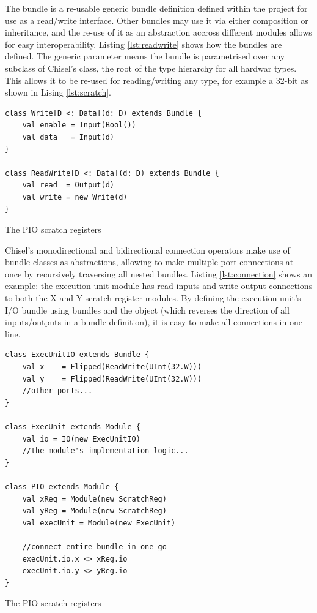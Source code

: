 The  bundle is a re-usable generic bundle definition defined within the project for use as a read/write interface. Other bundles may use it via either composition or inheritance, and the re-use of it as an abstraction accross different modules allows for easy interoperability. Listing \ref{lst:readwrite} shows how the bundles are defined. The generic parameter  means the bundle is parametrised over any subclass of Chisel's  class, the root of the type hierarchy for all hardwar types. This allows it to be re-used for reading/writing any type, for example a 32-bit  as shown in Lising \ref{lst:scratch}.

\begin{listing}[h!]
    \vspace{0.5cm}
    \begin{verbatim}
class Write[D <: Data](d: D) extends Bundle {
    val enable = Input(Bool())
    val data   = Input(d)
}

class ReadWrite[D <: Data](d: D) extends Bundle {
    val read  = Output(d)
    val write = new Write(d)
}
    \end{verbatim}
    \caption{The PIO scratch registers}
    \label{lst:readwrite}
\end{listing}

Chisel's monodirectional \txt{:=} and bidirectional \txt{<>} connection operators make use of bundle classes as abstractions, allowing to make multiple port connections at once by recursively traversing all nested bundles. Listing \ref{lst:connection} shows an example: the execution unit module has read inputs and write output connections to both the X and Y scratch register modules. By defining the execution unit's I/O bundle using  bundles and the  object (which reverses the direction of all inputs/outputs in a bundle definition), it is easy to make all connections in one line.

\begin{listing}[h!]
    \vspace{0.5cm}
    \begin{verbatim}
class ExecUnitIO extends Bundle {
    val x    = Flipped(ReadWrite(UInt(32.W)))
    val y    = Flipped(ReadWrite(UInt(32.W)))
    //other ports...          
}

class ExecUnit extends Module {
    val io = IO(new ExecUnitIO)
    //the module's implementation logic...
}

class PIO extends Module {
    val xReg = Module(new ScratchReg)
    val yReg = Module(new ScratchReg)
    val execUnit = Module(new ExecUnit)

    //connect entire bundle in one go
    execUnit.io.x <> xReg.io
    execUnit.io.y <> yReg.io
}
    \end{verbatim}
    \caption{The PIO scratch registers}
    \label{lst:connection}
\end{listing}

